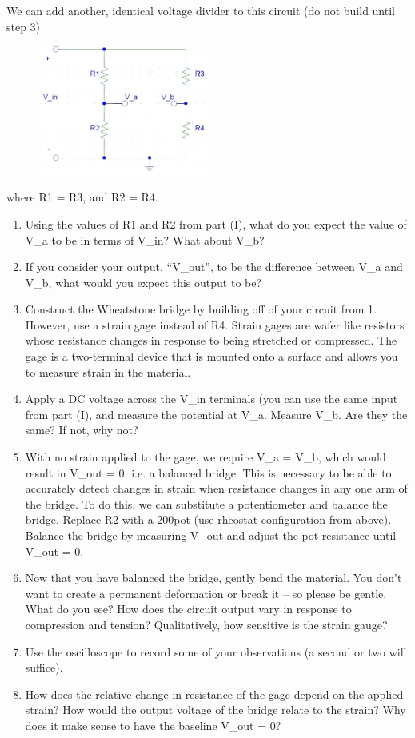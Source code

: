 \documentclass{article}
\begin{document}
We can add another, identical voltage divider to this circuit (do not build until step 3)\\

\begin{figure}[h!]
    	\includegraphics[width=0.5\textwidth]{lab_1_fig_8.jpg}
    	\centering
		\end{figure}

where R1 = R3, and R2 = R4.

\begin{enumerate}
	\item Using the values of R1 and R2 from part (I), what do you expect the value of V\_a to be in terms of V\_in? What about V\_b?
	\item If you consider your output, “V\_out”, to be the difference between V\_a and V\_b, what would you expect this output to be?
	\item Construct the Wheatstone bridge by building off of your circuit from 1. However, use a strain gage instead of R4. Strain gages are wafer like resistors whose resistance changes in response to being stretched or compressed. The gage is a two-terminal device that is mounted onto a surface and allows you to measure strain in the material.
	\item Apply a DC voltage across the V\_in terminals (you can use the same input from part (I), and measure the potential at V\_a. Measure V\_b. Are they the same? If not, why not?
	\item With no strain applied to the gage, we require V\_a = V\_b, which would result in V\_out = 0. i.e. a balanced bridge. This is necessary to be able to accurately detect changes in strain when resistance changes in any one arm of the bridge. To do this, we can substitute a potentiometer and balance the bridge. Replace R2 with a 200\textOmega pot (use rheostat configuration from above). Balance the bridge by measuring V\_out and adjust the pot resistance until V\_out = 0.
	\item Now that you have balanced the bridge, gently bend the material. You don’t want to create a permanent deformation or break it – so please be gentle. What do you see? How does the circuit output vary in response to compression and tension? Qualitatively, how sensitive is the strain gauge?
	\item Use the oscilloscope to record some of your observations (a second or two will suffice).
	\item How does the relative change in resistance of the gage depend on the applied strain? How would the output voltage of the bridge relate to the strain? Why does it make sense to have the baseline V\_out = 0?
\end{enumerate}
\end{document}
